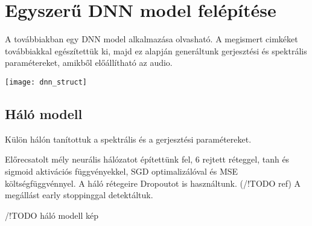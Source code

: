 \section{Egyszerű DNN model felépítése}
\label{dnn_model}
A továbbiakban egy DNN model alkalmazása olvasható. A megismert cimkéket továbbiakkal egészítettük ki, majd ez alapján generáltunk gerjesztési és spektrális paramétereket, amikből előállítható az audio.

\texttt{[image: dnn\_struct]}

\subsection{Háló modell}
Külön hálón tanítottuk a spektrális és a gerjesztési paramétereket. 

Előrecsatolt mély neurális hálózatot építettünk fel, 6 rejtett réteggel, tanh és sigmoid aktivációs függvényekkel, SGD optimalizálóval és MSE költségfüggvénnyel. A háló rétegeire Dropoutot is használtunk. (/!TODO ref)
A megállást early stoppinggal detektáltuk.

/!TODO háló modell kép